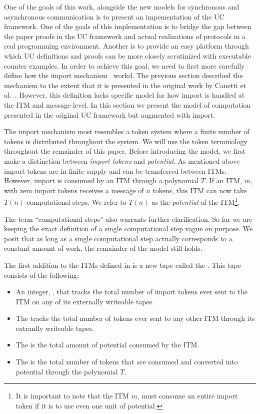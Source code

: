 One of the goals of this work, alongside the new models for synchronous and asynchronous communication is to present an impementation of the UC framework.
One of the goals of this implementation is to bridge the gap between the paper proofs in the UC framework and actual realizations of protocols in a real programming environment.
Another is to provide an easy platform through which UC definitions and proofs can be more closely scrutinized with executable counter examples.
In order to achieve this goal, we need to first more carefully define how the import mechanism~\cite{uc} workd.
The previous section described the mechanism to the extent that it is presented in the original work by Canetti et al.~\cite{uc}.
However, this definition lacks specific model for how import is handled at the ITM and message level.
In this section we present the model of computation presented in the original UC framework but augmented with import.

The import mechanism most resembles a token system where a finite number of tokens is distributed throughout the system.
We will use the token terminology throughout the remainder of this paper.
Before introducing the model, we first make a distinction between {\em import tokens} and {\em potential}.
As mentioned above import tokens are in finite supply and can be transferred between ITMs.
However, import is consumed by an ITM through a polynomial $T$.
If an ITM, $m$, with zero import tokens receives a message of $n$ tokens, this ITM can now take $T(n)$ computationsl steps.
We refer to $T(n)$ as the {\em potential} of the ITM\footnote{It is important to note that the ITM $m$, must consume an entire import token if it is to use even one unit of potential.}.

The term ``computational steps'' also warrants further clarification.
So far we are keeping the exact definition of a single computational step vague on purpose.
We posit that as long as a single computational step actually corresponds to a constant amount of work, the remainder of the model still holds. 


The first addition to the ITMs defined in \cite{uc} is a new tape called the .
This tape consists of the following:
\begin{itemize}
	\item An integer, , that tracks the total number of import tokens ever sent to the ITM on any of its externally writeable tapes.
	\item The  tracks the total number of tokens ever sent to any other ITM through its extranlly writeable tapes.
	\item The  is the total amount of potential consumed by the ITM.
	\item The  is the total number of tokens that are consumed and converted into potential through the polynomial $T$.
\end{itemize}

